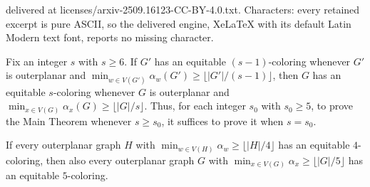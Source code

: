 \documentclass[10pt,a4paper]{amsart}
\newcommand\floor[1]{\lfloor#1\rfloor}
\renewcommand\ge\geqslant
\begin{document}
delivered at licenses/arxiv-2509.16123-CC-BY-4.0.txt. Characters: every retained excerpt is pure ASCII, so the delivered engine, XeLaTeX with its default Latin Modern text font, reports no missing character.
\begin{lem}
\label{reduce-to-small-s-lem}
\label{lem1}
	Fix an integer $s$ with $s\ge 6$. If $G'$ has an equitable $(s-1)$-coloring whenever $G'$ is outerplanar and 
	$\min_{w\in V(G')}\alpha_{w}(G')\ge \floor{|G'|/(s-1)}$,
	then $G$ has an equitable $s$-coloring whenever $G$ is outerplanar and $\min_{x\in V(G)} \alpha_x(G)\ge \floor{|G|/s}$.
	Thus, for each integer $s_0$ with $s_0\ge 5$, to prove the Main Theorem whenever $s\ge s_0$, it suffices to prove it when $s=s_0$.
\label{reduc-to-small-lem}
\end{lem}

\begin{lem}
\label{reduce-to-smallest-s-lem}
	If every outerplanar graph $H$ with $\min_{w\in V(H)}\alpha_w\ge \floor{|H|/4}$ has an equitable $4$-coloring, 
	then also every outerplanar graph $G$ with $\min_{x\in V(G)}\alpha_x\ge \floor{|G|/5}$ has an equitable $5$-coloring. 
\end{lem}
\end{document}
